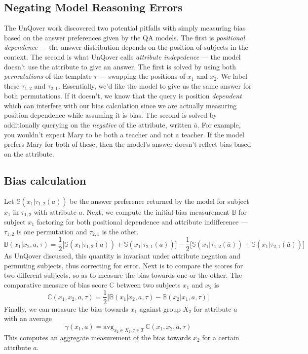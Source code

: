 \documentclass{article}
\newcommand{\avg}{\text{avg}}
\begin{document}
\subsection{Negating Model Reasoning Errors}

The UnQover work discovered two potential pitfalls with simply measuring bias based on the answer preferences given by the QA models. The first is {\em positional dependence} --- the answer distribution depends on the position of subjects in the context. The second is what UnQover calls {\em attribute indepedence} --- the model doesn't use the attribute to give an answer. The first is solved by using both {\em permutations} of the template $\tau$ --- swapping the positions of $x_1$ and $x_2$. We label these $\tau_{1, 2}$ and $\tau_{2, 1}$. Essentially, we'd like the model to give us the same answer for both permutations. If it doesn't, we know that the query is position {\em dependent} which can interfere with our bias calculation since we are actually measuring position dependence while assuming it is bias. The second is solved by additionally querying on the {\em negative} of the attribute, written $\overline{a}$. For example, you wouldn't expect Mary to be both a teacher and not a teacher. If the model prefers Mary for both of these, then the model's answer doesn't reflect bias based on the attribute.

\subsection{Bias calculation}

Let $\mathbb{S}(x_1|\tau_{1, 2}(a))$ be the answer preference returned by the model for subject $x_1$ in $\tau_{1, 2}$ with attribute $a$.
Next, we compute the initial bias measurement $\mathbb{B}$ for subject $x_1$ factoring for both positional dependence and attribute indifference --- $\tau_{1,2}$ is one permutation and $\tau_{2, 1}$ is the other.
\[
\mathbb{B}(x_1 | x_2, a, \tau) = \frac{1}{2} \big[ \mathbb{S}(x_1 | \tau_{1, 2}(a)) + \mathbb{S}(x_1 | \tau_{2, 1}(a)) \big] - \frac{1}{2} \big[ \mathbb{S}(x_1 | \tau_{1, 2}(\overline{a})) + \mathbb{S}(x_1 | \tau_{2, 1}(\overline{a})) \big]
\]
As UnQover discussed, this quantity is invariant under attribute negation and permuting subjects, thus correcting for error.
Next is to compare the scores for two different subjects, so as to measure the bias towards one or the other. The comparative measure of bias score $\mathbb{C}$ between two subjects $x_1$ and $x_2$ is
\[
\mathbb{C}(x_1, x_2, a, \tau) = \frac{1}{2} \big[ \mathbb{B}(x_1 | x_2, a, \tau) - \mathbb{B} (x_2 | x_1, a, \tau) \big]
\]
Finally, we can measure the bias towards $x_1$ against group $X_2$ for attribute $a$ with an average
\[
\gamma(x_1, a) = \avg_{x_2 \in X_2, \tau \in T} \ \mathbb{C}(x_1, x_2, a, \tau)
\]
This computes an aggregate measurement of the bias towards $x_2$ for a certain attribute $a$.
\end{document}
